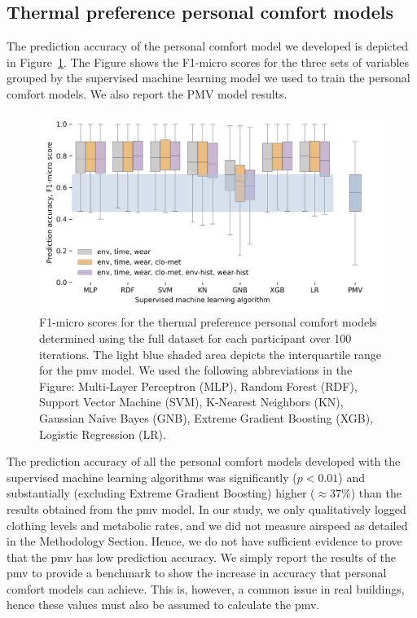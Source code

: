 \subsection{Thermal preference personal comfort models}
The prediction accuracy of the personal comfort model we developed is depicted in Figure~\ref{fig:boxen_comp_metrics_thermal}.
The Figure shows the F1-micro scores for the three sets of variables grouped by the supervised machine learning model we used to train the personal comfort models.
We also report the PMV model results.
\begin{figure}
    \begin{center}
        \includegraphics[width=\linewidth,height=\textheight,keepaspectratio]{figures/figure_8}
    \end{center}
    \caption{F1-micro scores for the thermal preference personal comfort models determined using the full dataset for each participant over 100 iterations.
    The light blue shaded area depicts the interquartile range for the \ac{pmv} model. We used the following abbreviations in the Figure: Multi-Layer Perceptron (MLP), Random Forest (RDF), Support Vector Machine (SVM), K-Nearest Neighbors (KN), Gaussian Naive Bayes (GNB), Extreme Gradient Boosting (XGB), Logistic Regression (LR).}\label{fig:boxen_comp_metrics_thermal}
\end{figure}
The prediction accuracy of all the personal comfort models developed with the supervised machine learning algorithms was significantly ($p < 0.01$) and substantially (excluding Extreme Gradient Boosting) higher ($\approx37\%$) than the results obtained from the \ac{pmv} model.
In our study, we only qualitatively logged clothing levels and metabolic rates, and we did not measure airspeed as detailed in the Methodology Section.
Hence, we do not have sufficient evidence to prove that the \ac{pmv} has low prediction accuracy.
We simply report the results of the \ac{pmv} to provide a benchmark to show the increase in accuracy that personal comfort models can achieve.
This is, however, a common issue in real buildings, hence these values must also be assumed to calculate the \ac{pmv}.

